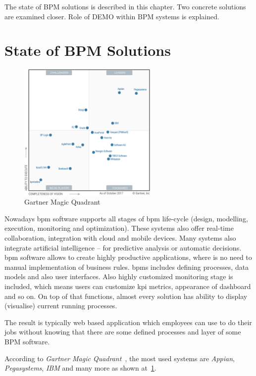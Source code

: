 The state of BPM solutions is described in this chapter. Two concrete solutions are examined closer. Role of DEMO within BPM systems is explained. 
\section{State of BPM Solutions}
\begin{figure}[ht!]
	\centering
    \includegraphics[width=0.6\textwidth, keepaspectratio]{img/gartner-magic-quadrant.png}
    \caption{Gartner Magic Quadrant \cite{gartner-2017} }
    \label{fig:gartner-magic-quadrant}
\end{figure}

Nowadays \gls{bpm} software supports all stages of \gls{bpm} life-cycle (design, modelling, execution, monitoring and optimization). These systems also offer real-time collaboration, integration with cloud and mobile devices. Many systems also integrate artificial intelligence -- for predictive analysis or automatic decisions. \gls{bpm} software allows to create highly productive applications, where is no need to manual implementation of business rules. \gls{bpms} includes defining processes, data models and also user interfaces. Also highly customized monitoring stage is included, which means users can customize \gls{kpi} metrics, appearance of dashboard and so on. On top of that functions, almost every solution has ability to display (visualise) current running processes.  

The result is typically web based application which employees can use to do their jobs without knowing that there are some defined processes and layer of some BPM software. 

According to \textit{Gartner Magic Quadrant}~\cite{gartner-2017}, the most used systems are \textit{Appian}, \textit{Pegasystems}, \textit{IBM} and many more as shown at~\cref{fig:gartner-magic-quadrant}.
